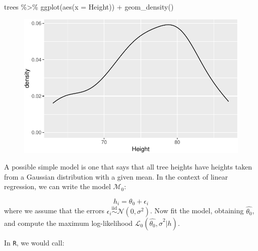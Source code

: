 \documentclass[
  letterpaper,
  DIV=11,
  numbers=noendperiod]{scrreprt}
\newenvironment{Shaded}{\begin{snugshade}}{\end{snugshade}}
\newcommand{\AttributeTok}[1]{\textcolor[rgb]{0.40,0.45,0.13}{#1}}
\newcommand{\CommentTok}[1]{\textcolor[rgb]{0.37,0.37,0.37}{#1}}
\newcommand{\DecValTok}[1]{\textcolor[rgb]{0.68,0.00,0.00}{#1}}
\newcommand{\FunctionTok}[1]{\textcolor[rgb]{0.28,0.35,0.67}{#1}}
\newcommand{\NormalTok}[1]{\textcolor[rgb]{0.00,0.23,0.31}{#1}}
\newcommand{\OtherTok}[1]{\textcolor[rgb]{0.00,0.23,0.31}{#1}}
\newcommand{\SpecialCharTok}[1]{\textcolor[rgb]{0.37,0.37,0.37}{#1}}
\begin{document}
\begin{Shaded}
\begin{Highlighting}[]
\NormalTok{trees }\SpecialCharTok{\%\textgreater{}\%} \FunctionTok{ggplot}\NormalTok{(}\FunctionTok{aes}\NormalTok{(}\AttributeTok{x =}\NormalTok{ Height)) }\SpecialCharTok{+} \FunctionTok{geom\_density}\NormalTok{()}
\end{Highlighting}
\end{Shaded}

\begin{figure}[H]

{\centering \includegraphics{./10-model_selection_files/figure-pdf/unnamed-chunk-4-1.pdf}

}

\end{figure}

A possible simple model is one that says that all tree heights have
heights taken from a Gaussian distribution with a given mean. In the
context of linear regression, we can write the model \(\mathcal M_0\):

\[
h_i = \theta_0 + \epsilon_i
\] where we assume that the errors
\(\epsilon_i \overset{\text{iid}}{\sim} \mathcal N(0, \sigma^2)\). Now
fit the model, obtaining \(\hat{\theta_0}\), and compute the maximum
log-likelihood \(\mathcal L_0(\hat{\theta_0}, \hat{\sigma}^2 \vert h)\).

In \texttt{R}, we would call:

\begin{Shaded}
\end{Shaded}
\end{document}
